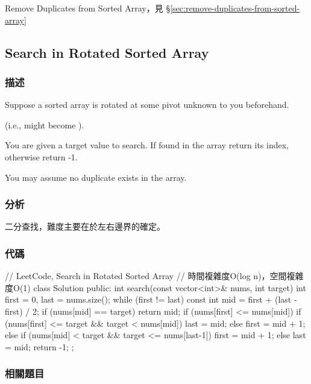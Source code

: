 \begindot
\item Remove Duplicates from Sorted Array，見 \S \ref{sec:remove-duplicates-from-sorted-array}
\myenddot


\subsection{Search in Rotated Sorted Array}
\label{sec:search-in-rotated-sorted-array}


\subsubsection{描述}
Suppose a sorted array is rotated at some pivot unknown to you beforehand.

(i.e.,  might become ).

You are given a target value to search. If found in the array return its index, otherwise return -1.

You may assume no duplicate exists in the array.


\subsubsection{分析}
二分查找，難度主要在於左右邊界的確定。


\subsubsection{代碼}
\begin{Code}
// LeetCode, Search in Rotated Sorted Array
// 時間複雜度O(log n)，空間複雜度O(1)
class Solution {
public:
    int search(const vector<int>& nums, int target) {
        int first = 0, last = nums.size();
        while (first != last) {
            const int mid = first  + (last - first) / 2;
            if (nums[mid] == target)
                return mid;
            if (nums[first] <= nums[mid]) {
                if (nums[first] <= target && target < nums[mid])
                    last = mid;
                else
                    first = mid + 1;
            } else {
                if (nums[mid] < target && target <= nums[last-1])
                    first = mid + 1;
                else
                    last = mid;
            }
        }
        return -1;
    }
};
\end{Code}


\subsubsection{相關題目}

